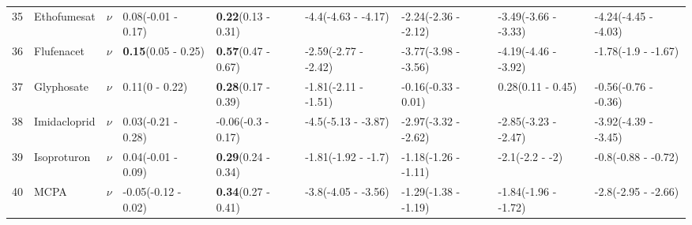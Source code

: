 \begin{longtable}{lp{2cm}p{0.6cm}p{1.8cm}p{1.8cm}p{1.8cm}p{1.8cm}p{1.8cm}p{1.8cm}}
  35 & Ethofumesat & $\nu$ & 0.08\newline (-0.01 - 0.17) & \textbf{0.22}\newline (0.13 - 0.31) & -4.4\newline (-4.63 - -4.17) & -2.24\newline (-2.36 - -2.12) & -3.49\newline (-3.66 - -3.33) & -4.24\newline (-4.45 - -4.03) \\ 
  36 & Flufenacet & $\nu$ & \textbf{0.15}\newline (0.05 - 0.25) & \textbf{0.57}\newline (0.47 - 0.67) & -2.59\newline (-2.77 - -2.42) & -3.77\newline (-3.98 - -3.56) & -4.19\newline (-4.46 - -3.92) & -1.78\newline (-1.9 - -1.67) \\ 
  37 & Glyphosate & $\nu$ & 0.11\newline (0 - 0.22) & \textbf{0.28}\newline (0.17 - 0.39) & -1.81\newline (-2.11 - -1.51) & -0.16\newline (-0.33 - 0.01) & 0.28\newline (0.11 - 0.45) & -0.56\newline (-0.76 - -0.36) \\ 
  38 & Imidacloprid & $\nu$ & 0.03\newline (-0.21 - 0.28) & -0.06\newline (-0.3 - 0.17) & -4.5\newline (-5.13 - -3.87) & -2.97\newline (-3.32 - -2.62) & -2.85\newline (-3.23 - -2.47) & -3.92\newline (-4.39 - -3.45) \\ 
  39 & Isoproturon & $\nu$ & 0.04\newline (-0.01 - 0.09) & \textbf{0.29}\newline (0.24 - 0.34) & -1.81\newline (-1.92 - -1.7) & -1.18\newline (-1.26 - -1.11) & -2.1\newline (-2.2 - -2) & -0.8\newline (-0.88 - -0.72) \\ 
  40 & MCPA & $\nu$ & -0.05\newline (-0.12 - 0.02) & \textbf{0.34}\newline (0.27 - 0.41) & -3.8\newline (-4.05 - -3.56) & -1.29\newline (-1.38 - -1.19) & -1.84\newline (-1.96 - -1.72) & -2.8\newline (-2.95 - -2.66) \\ 

\end{longtable}
